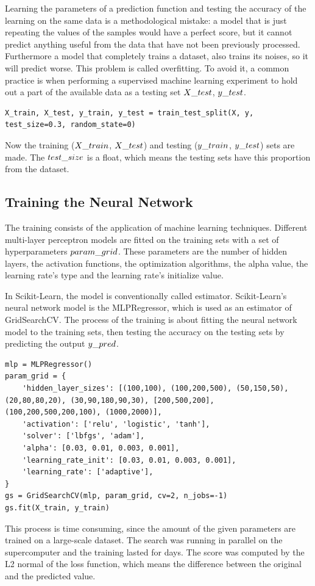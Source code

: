 Learning the parameters of a prediction function and testing the accuracy of the learning on the same data is a methodological mistake: a model that is just repeating the values of the samples would have a perfect score, but it cannot predict anything useful from the data that have not been previously processed. Furthermore a model that completely trains a dataset, also trains its noises, so it will predict worse. This problem is called overfitting. To avoid it, a common practice is when performing a supervised machine learning experiment to hold out a part of the available data as a testing set $X\char`_test$, $y\char`_test$. 
\begin{lstlisting}
X_train, X_test, y_train, y_test = train_test_split(X, y, test_size=0.3, random_state=0)
\end{lstlisting}
Now the training ($X\char`_train$, $X\char`_test$) and testing ($y\char`_train$, $y\char`_test$) sets are made. The $test\char`_size$ is a float, which means the testing sets have this proportion from the dataset.



\subsection{Training the Neural Network}

The training consists of the application of machine learning techniques. Different multi-layer perceptron models are fitted on the training sets with a set of hyperparameters $param\char`_grid$. These parameters are the number of hidden layers, the activation functions, the optimization algorithms, the alpha value, the learning rate's type and the learning rate's initialize value. \medskip

In Scikit-Learn, the model is conventionally called estimator. Scikit-Learn's neural network model is the MLPRegressor, which is used as an estimator of GridSearchCV. The process of the training is about fitting the neural network model to the training sets, then testing the accuracy on the testing sets by predicting the output $y\char`_pred$. \medskip

\begin{lstlisting}
mlp = MLPRegressor()
param_grid = {
	'hidden_layer_sizes': [(100,100), (100,200,500), (50,150,50), (20,80,80,20), (30,90,180,90,30), [200,500,200], (100,200,500,200,100), (1000,2000)],
	'activation': ['relu', 'logistic', 'tanh'],
	'solver': ['lbfgs', 'adam'],
	'alpha': [0.03, 0.01, 0.003, 0.001],
	'learning_rate_init': [0.03, 0.01, 0.003, 0.001],
	'learning_rate': ['adaptive'],
}
gs = GridSearchCV(mlp, param_grid, cv=2, n_jobs=-1)
gs.fit(X_train, y_train)
\end{lstlisting}
This process is time consuming, since the amount of the given parameters are trained on a large-scale dataset. The search was running in parallel on the supercomputer and the training lasted for days. The score was computed by the L2 normal of the loss function, which means the difference between the original and the predicted value. \smallskip

